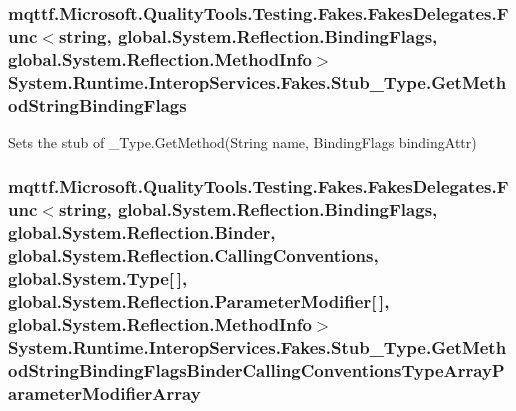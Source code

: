 \hypertarget{class_system_1_1_runtime_1_1_interop_services_1_1_fakes_1_1_stub___type_acb6ae5a473b56a04ace3c2d5afa8d0ed}{
\subsubsection[{Get\-Method\-String\-Binding\-Flags}]{\setlength{\rightskip}{0pt plus 5cm}mqttf.\-Microsoft.\-Quality\-Tools.\-Testing.\-Fakes.\-Fakes\-Delegates.\-Func$<$string, global.\-System.\-Reflection.\-Binding\-Flags, global.\-System.\-Reflection.\-Method\-Info$>$ System.\-Runtime.\-Interop\-Services.\-Fakes.\-Stub\-\_\-\-Type.\-Get\-Method\-String\-Binding\-Flags}}\label{class_system_1_1_runtime_1_1_interop_services_1_1_fakes_1_1_stub___type_acb6ae5a473b56a04ace3c2d5afa8d0ed}


Sets the stub of \-\_\-\-Type.\-Get\-Method(\-String name, Binding\-Flags binding\-Attr)

\hypertarget{class_system_1_1_runtime_1_1_interop_services_1_1_fakes_1_1_stub___type_abd29f0b5aa26cf95b71bc5a858de68a9}{
\subsubsection[{Get\-Method\-String\-Binding\-Flags\-Binder\-Calling\-Conventions\-Type\-Array\-Parameter\-Modifier\-Array}]{\setlength{\rightskip}{0pt plus 5cm}mqttf.\-Microsoft.\-Quality\-Tools.\-Testing.\-Fakes.\-Fakes\-Delegates.\-Func$<$string, global.\-System.\-Reflection.\-Binding\-Flags, global.\-System.\-Reflection.\-Binder, global.\-System.\-Reflection.\-Calling\-Conventions, global.\-System.\-Type\mbox{[}$\,$\mbox{]}, global.\-System.\-Reflection.\-Parameter\-Modifier\mbox{[}$\,$\mbox{]}, global.\-System.\-Reflection.\-Method\-Info$>$ System.\-Runtime.\-Interop\-Services.\-Fakes.\-Stub\-\_\-\-Type.\-Get\-Method\-String\-Binding\-Flags\-Binder\-Calling\-Conventions\-Type\-Array\-Parameter\-Modifier\-Array}}\label{class_system_1_1_runtime_1_1_interop_services_1_1_fakes_1_1_stub___type_abd29f0b5aa26cf95b71bc5a858de68a9}


